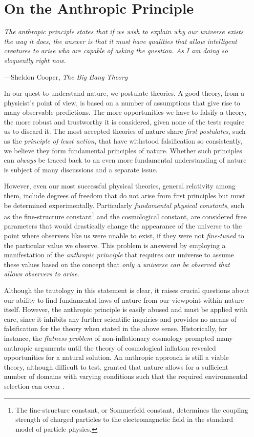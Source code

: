 \chapter{On the Anthropic Principle}\label{app:anthropic}

\epigraph{\itshape The anthropic principle states that if we wish to explain why our universe exists the way it does, the answer is that it must have qualities that allow intelligent creatures to arise who are capable of asking the question. As I am doing so eloquently right now.}{---Sheldon Cooper, \textit{The Big Bang Theory}\footnotemark}

In our quest to understand nature, we postulate theories. A good theory, from a physicist's point of view, is based on a number of assumptions that give rise to many observable predictions. The more opportunities we have to falsify a theory, the more robust and trustworthy it is considered, given none of the tests require us to discard it. The most accepted theories of nature share \emph{first postulates}, such as the \emph{principle of least action}, that have withstood falsification so consistently, we believe they form fundamental principles of nature. Whether such principles can \emph{always} be traced back to an even more fundamental understanding of nature is subject of many discussions and a separate issue.

However, even our most successful physical theories, general relativity among them, include degrees of freedom that do not arise from first principles but must be determined experimentally. Particularly \emph{fundamental physical constants}, such as the fine-structure constant\footnote{The fine-structure constant, or Sommerfeld constant, determines the coupling strength of charged particles to the electromagnetic field in the standard model of particle physics.} and the cosmological constant, are considered free parameters that would drastically change the appearance of the universe to the point where observers like us were unable to exist, if they were not \emph{fine-tuned} to the particular value we observe. This problem is answered by employing a manifestation of the \emph{anthropic principle} that requires our universe to assume these values based on the concept that \emph{only a universe can be observed that allows observers to arise}.

Although the tautology in this statement is clear, it raises crucial questions about our ability to find fundamental laws of nature from our viewpoint within nature itself. However, the anthropic principle is easily abused and must be applied with care, since it inhibits any further scientific inquiries and provides no means of falsification for the theory when stated in the above sense. Historically, for instance, the \emph{flatness problem} of non-inflationary cosmology prompted many anthropic arguments until the theory of cosmological inflation revealed opportunities for a natural solution. An anthropic approach is still a viable theory, although difficult to test, granted that nature allows for a sufficient number of domains with varying conditions such that the required environmental selection can occur \autocite{Carroll2003}.

